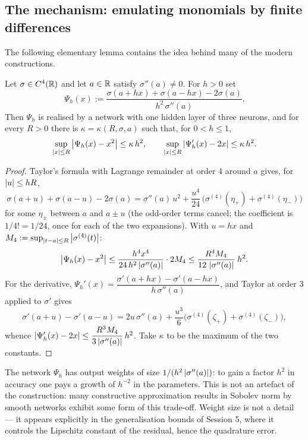 \documentclass[11pt,a4paper]{article}
\begin{document}
\subsection{The mechanism: emulating monomials by finite differences}

The following elementary lemma contains the idea behind many of the modern constructions.

\begin{lemma}[Emulating $x^2$]\label{lem:emul}
Let $\sigma \in C^4(\mathbb{R})$ and let $a \in \mathbb{R}$ satisfy $\sigma''(a) \ne 0$. For $h > 0$ set
\[
\Psi_h(x) := \frac{\sigma(a + hx) + \sigma(a - hx) - 2\sigma(a)}{h^2\, \sigma''(a)} .
\]
Then $\Psi_h$ is realised by a network with one hidden layer of three neurons, and for every
$R > 0$ there is $\kappa = \kappa(R,\sigma,a)$ such that, for $0 < h \le 1$,
\[
\sup_{\left\lvert x \right\rvert \le R} \left\lvert \Psi_h(x) - x^2 \right\rvert \le \kappa\, h^2,
\qquad
\sup_{\left\lvert x \right\rvert \le R} \left\lvert \Psi_h'(x) - 2x \right\rvert \le \kappa\, h^2 .
\]
\end{lemma}

\begin{proof}
Taylor's formula with Lagrange remainder at order 4 around $a$ gives, for $\left\lvert u \right\rvert \le hR$,
\[
\sigma(a+u) + \sigma(a-u) - 2\sigma(a) = \sigma''(a)\, u^2 + \frac{u^4}{24}\,\big(\sigma^{(4)}(\eta_+) + \sigma^{(4)}(\eta_-)\big)
\]
for some $\eta_\pm$ between $a$ and $a \pm u$ (the odd-order terms cancel; the coefficient is
$1/4! = 1/24$, once for each of the two expansions). With $u = hx$ and
$M_4 := \sup_{\left\lvert t - a \right\rvert \le R}\left\lvert \sigma^{(4)}(t) \right\rvert$:
\[
\left\lvert \Psi_h(x) - x^2 \right\rvert \le \frac{h^4 x^4}{24\, h^2 \left\lvert \sigma''(a) \right\rvert} \cdot 2 M_4
\le \frac{R^4 M_4}{12\,\left\lvert \sigma''(a) \right\rvert}\; h^2 .
\]
For the derivative, $\Psi_h'(x) = \dfrac{\sigma'(a+hx) - \sigma'(a-hx)}{h\,\sigma''(a)}$, and
Taylor at order 3 applied to $\sigma'$ gives
\[
\sigma'(a+u)-\sigma'(a-u) = 2u\,\sigma''(a) + \frac{u^3}{6}\big(\sigma^{(4)}(\zeta_+) + \sigma^{(4)}(\zeta_-)\big),
\]
whence $\left\lvert \Psi_h'(x) - 2x \right\rvert \le \dfrac{R^3 M_4}{3\left\lvert \sigma''(a) \right\rvert}\, h^2$. Take $\kappa$ to be the
maximum of the two constants.
\end{proof}

\begin{remark}\label{rem:weights}
The network $\Psi_h$ has output weights of size $1/(h^2\left\lvert \sigma''(a) \right\rvert)$: to gain a factor $h^2$
in accuracy one pays a growth of $h^{-2}$ in the parameters. This is not an artefact of the
construction: many constructive approximation results in Sobolev norm by smooth networks exhibit
some form of this trade-off. Weight size is not
a detail --- it appears explicitly in the generalisation bounds of Session 5, where it controls the
Lipschitz constant of the residual, hence the quadrature error.
\end{remark}
\end{document}
